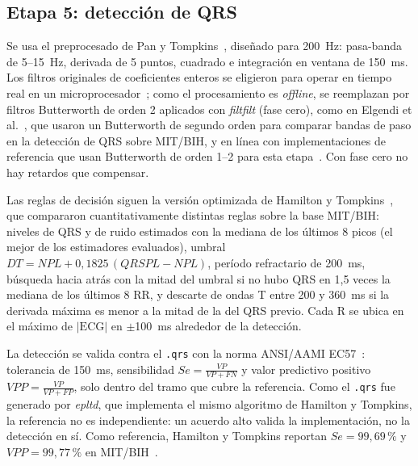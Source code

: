 \documentclass[11pt,a4paper]{article}
\begin{document}
\subsection{Etapa 5: detección de QRS}
Se usa el preprocesado de Pan y Tompkins~\cite{pantompkins1985}, diseñado para 200~Hz: pasa-banda de 5--15~Hz, derivada de 5 puntos, cuadrado e integración en ventana de 150~ms. Los filtros originales de coeficientes enteros se eligieron para operar en tiempo real en un microprocesador~\cite{pantompkins1985,hamilton1986}; como el procesamiento es \textit{offline}, se reemplazan por filtros Butterworth de orden 2 aplicados con \textit{filtfilt} (fase cero), como en Elgendi et al.~\cite{elgendi2010}, que usaron un Butterworth de segundo orden para comparar bandas de paso en la detección de QRS sobre MIT/BIH, y en línea con implementaciones de referencia que usan Butterworth de orden 1--2 para esta etapa~\cite{makowski2021}. Con fase cero no hay retardos que compensar.

Las reglas de decisión siguen la versión optimizada de Hamilton y Tompkins~\cite{hamilton1986}, que compararon cuantitativamente distintas reglas sobre la base MIT/BIH: niveles de QRS y de ruido estimados con la mediana de los últimos 8 picos (el mejor de los estimadores evaluados), umbral $DT = NPL + 0{,}1825\,(QRSPL - NPL)$, período refractario de 200~ms, búsqueda hacia atrás con la mitad del umbral si no hubo QRS en 1,5 veces la mediana de los últimos 8 RR, y descarte de ondas T entre 200 y 360~ms si la derivada máxima es menor a la mitad de la del QRS previo. Cada R se ubica en el máximo de $|\text{ECG}|$ en $\pm$100~ms alrededor de la detección.

La detección se valida contra el \texttt{.qrs} con la norma ANSI/AAMI EC57~\cite{ec57}: tolerancia de 150~ms, sensibilidad $Se = \frac{VP}{VP+FN}$ y valor predictivo positivo $VPP = \frac{VP}{VP+FP}$, solo dentro del tramo que cubre la referencia. Como el \texttt{.qrs} fue generado por \textit{epltd}, que implementa el mismo algoritmo de Hamilton y Tompkins, la referencia no es independiente: un acuerdo alto valida la implementación, no la detección en sí. Como referencia, Hamilton y Tompkins reportan $Se = 99{,}69\,\%$ y $VPP = 99{,}77\,\%$ en MIT/BIH~\cite{hamilton1986}.
\end{document}
